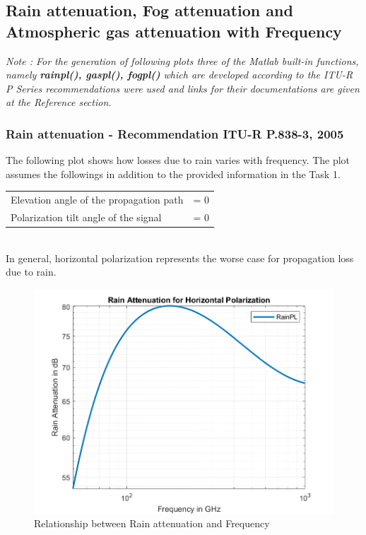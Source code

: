 \documentclass[a4paper,11pt]{article}%
\begin{document}
\pagebreak
\subsection{Rain attenuation, Fog attenuation and Atmospheric gas attenuation with Frequency}

\textit{Note : For the generation of following plots three of the Matlab built-in functions, namely \textbf{rainpl()\cite{matlab}, gaspl()\cite{matlab}, fogpl()\cite{matlab}} which are developed according to the ITU-R P Series recommendations were used and links for their documentations are given at the Reference section.}


\subsubsection{Rain attenuation - Recommendation ITU-R P.838-3, 2005\cite{rain}}
The following plot shows how losses due to rain varies with frequency. The plot assumes the followings in addition to the provided information in the Task 1.\\

\begin{tabular}{l l}
Elevation angle of the propagation path& = 0 \\
Polarization tilt angle of the signal &= 0\\
\end{tabular}\\

In general, horizontal polarization represents the worse case for propagation loss due to rain.

\begin{figure}[!h]
	\centering
	\includegraphics[scale=0.75]{code/RainPL.png}
	\caption{Relationship between Rain attenuation and Frequency}
\end{figure}
\end{document}
